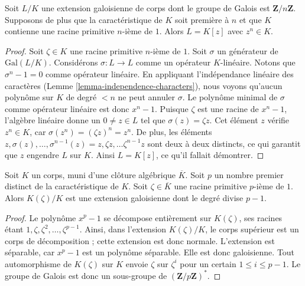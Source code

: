 \begin{lemma}
\label{lemma-Kummer}
Soit $L/K$ une extension galoisienne de corps dont le groupe de Galois est
$\mathbf{Z}/n\mathbf{Z}$. Supposons de plus que la caractéristique de $K$
soit première à $n$ et que $K$ contienne une racine primitive $n$-ième de $1$.
Alors $L = K[z]$ avec $z^n \in K$.
\end{lemma}

\begin{proof}
Soit $\zeta \in K$ une racine primitive $n$-ième de $1$.
Soit $\sigma$ un générateur de $\text{Gal}(L/K)$.
Considérons $\sigma : L \to L$ comme un opérateur $K$-linéaire.
Notons que $\sigma^n - 1 = 0$ comme opérateur linéaire.
En appliquant l'indépendance linéaire des caractères
(Lemme \ref{lemma-independence-characters}), nous voyons
qu'aucun polynôme sur $K$ de degré $< n$ ne peut
annuler $\sigma$. Le polynôme minimal de $\sigma$
comme opérateur linéaire est donc $x^n - 1$. 
Puisque $\zeta$ est une racine de $x^n - 1$, l'algèbre linéaire
donne un $0 \neq z \in L$ tel que $\sigma(z) = \zeta z$.
Cet élément $z$ vérifie $z^n \in K$, car
$\sigma(z^n) = (\zeta z)^n = z^n$. De plus, les éléments
$z, \sigma(z), \ldots, \sigma^{n - 1}(z) =
z, \zeta z, \ldots \zeta^{n - 1} z$ sont deux à deux distincts,
ce qui garantit que $z$ engendre $L$ sur $K$.
Ainsi $L = K[z]$, ce qu'il fallait démontrer.
\end{proof}

\begin{lemma}
\label{lemma-adjoint-pth-root-unity}
Soit $K$ un corps, muni d'une clôture algébrique $\overline{K}$.
Soit $p$ un nombre premier distinct de la caractéristique de $K$.
Soit $\zeta \in \overline{K}$ une racine primitive $p$-ième
de $1$. Alors $K(\zeta)/K$ est une extension galoisienne dont le degré divise $p - 1$.
\end{lemma}

\begin{proof}
Le polynôme $x^p - 1$ se décompose entièrement sur
$K(\zeta)$, ses racines étant $1, \zeta, \zeta^2, \ldots, \zeta^{p - 1}$.
Ainsi, dans l'extension $K(\zeta)/K$, le corps supérieur est un corps de
décomposition ; cette extension est donc normale.
L'extension est séparable, car $x^p - 1$ est un polynôme séparable.
Elle est donc galoisienne. Tout automorphisme de $K(\zeta)$ sur $K$
envoie $\zeta$ sur $\zeta^i$ pour un certain $1 \leq i \leq p - 1$.
Le groupe de Galois est donc un sous-groupe de $(\mathbf{Z}/p\mathbf{Z})^*$.
\end{proof}

